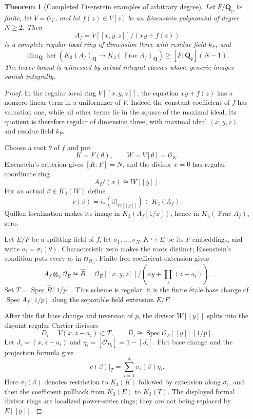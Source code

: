 \documentclass[11pt,a4paper]{article}
\newtheorem{theorem}{Theorem}[section]
\theoremstyle{remark}
\newcommand{\Q}{\mathbf Q}
\newcommand{\OO}{\mathcal O}
\newcommand{\Spec}{\operatorname{Spec}}
\newcommand{\Frac}{\operatorname{Frac}}
\begin{document}
\begin{theorem}[Completed Eisenstein examples of arbitrary degree]
\label{thm:completedeisensteinrank}\label{thm:completedtamerank}
Let $F/\Q_p$ be finite, let $V=\OO_F$, and let $f(z)\in V[z]$ be an Eisenstein polynomial of degree $N\geq2$. Then
\[
A_f=V[[x,y,z]]/(xy+f(z))
\]
is a complete regular local ring of dimension three with residue field $k_F$, and
\[
\dim_{\Q}\ker\left(K_3(A_f)_{\Q}
\longrightarrow K_3(\Frac A_f)_{\Q}\right)
\geq [F:\Q_p](N-1).
\]
The lower bound is witnessed by actual integral classes whose generic images vanish integrally.
\end{theorem}

\begin{proof}
In the regular local ring $V[[x,y,z]]$, the equation $xy+f(z)$ has a nonzero linear term in a uniformizer of $V$. Indeed the constant coefficient of $f$ has valuation one, while all other terms lie in the square of the maximal ideal. Its quotient is therefore regular of dimension three, with maximal ideal $(x,y,z)$ and residue field $k_F$.

Choose a root $\theta$ of $f$ and put
\[
K=F(\theta),\qquad W=V[\theta]=\OO_K.
\]
Eisenstein's criterion gives $[K:F]=N$, and the divisor $x=0$ has regular coordinate ring
\[
A_f/(x)\cong W[[y]].
\]
For an actual $\beta\in K_3(W)$ define
\[
c(\beta)=i_*(\beta|_{W[[y]]})\in K_3(A_f).
\]
Quillen localization \cite{Quillen} makes its image in $K_3(A_f[1/x])$, hence in $K_3(\Frac A_f)$, zero.

Let $E/F$ be a splitting field of $f$, let $\sigma_1,\ldots,\sigma_N:K\hookrightarrow E$ be its $F$-embeddings, and write $a_i=\sigma_i(\theta)$. Characteristic zero makes the roots distinct; Eisenstein's condition puts every $a_i$ in $\mathfrak m_{\OO_E}$. Finite free coefficient extension gives
\[
A_f\otimes_V\OO_E
\cong
\widehat B=\OO_E[[x,y,z]]/
\left(xy+\prod_i(z-a_i)\right).
\]
Set $T=\Spec\widehat B[1/p]$. This scheme is regular: it is the finite \'etale base change of $\Spec A_f[1/p]$ along the separable field extension $E/F$.

After this flat base change and inversion of $p$, the divisor $W[[y]]$ splits into the disjoint regular Cartier divisors
\[
D_i=V(x,z-a_i)\subset T,\qquad
D_i\cong\Spec\OO_E[[y]][1/p].
\]
Let $J_i=(x,z-a_i)$ and $\eta_i=[\OO_{D_i}]=1-[J_i]$. Flat base change and the projection formula give
\begin{equation}\label{eq:tamegysin}
c(\beta)|_T=\sum_{i=1}^N\sigma_i(\beta)\eta_i.
\end{equation}
Here $\sigma_i(\beta)$ denotes restriction to $K_3(K)$ followed by extension along $\sigma_i$, and then the coefficient pullback from $K_3(E)$ to $K_3(T)$. The displayed formal divisor rings are localized power-series rings; they are not being replaced by $E[[y]]$.


\end{proof}
\end{document}
